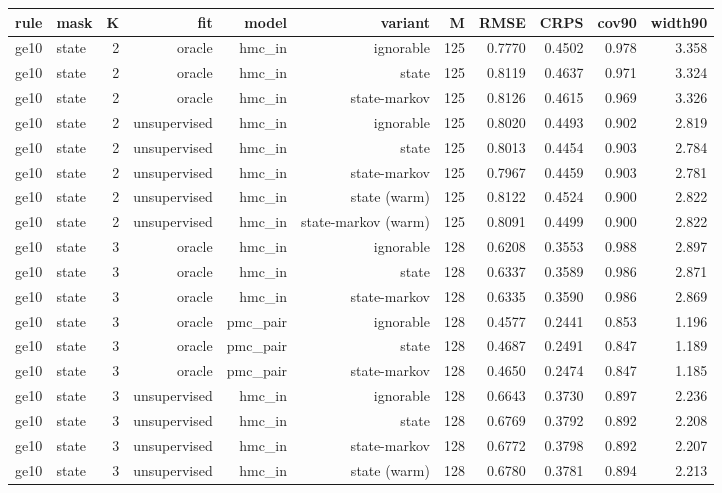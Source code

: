 \begin{table}[ht]
\centering
\small
\begin{tabular}{llrrrrrrrrr}
\toprule
rule & mask & K & fit & model & variant & M & RMSE & CRPS & cov90 & width90 \\
\midrule
ge10 & state & 2 & oracle & hmc\_in & ignorable & 125 & 0.7770 & 0.4502 & 0.978 & 3.358 \\
ge10 & state & 2 & oracle & hmc\_in & state & 125 & 0.8119 & 0.4637 & 0.971 & 3.324 \\
ge10 & state & 2 & oracle & hmc\_in & state-markov & 125 & 0.8126 & 0.4615 & 0.969 & 3.326 \\
ge10 & state & 2 & unsupervised & hmc\_in & ignorable & 125 & 0.8020 & 0.4493 & 0.902 & 2.819 \\
ge10 & state & 2 & unsupervised & hmc\_in & state & 125 & 0.8013 & 0.4454 & 0.903 & 2.784 \\
ge10 & state & 2 & unsupervised & hmc\_in & state-markov & 125 & 0.7967 & 0.4459 & 0.903 & 2.781 \\
ge10 & state & 2 & unsupervised & hmc\_in & state (warm) & 125 & 0.8122 & 0.4524 & 0.900 & 2.822 \\
ge10 & state & 2 & unsupervised & hmc\_in & state-markov (warm) & 125 & 0.8091 & 0.4499 & 0.900 & 2.822 \\
ge10 & state & 3 & oracle & hmc\_in & ignorable & 128 & 0.6208 & 0.3553 & 0.988 & 2.897 \\
ge10 & state & 3 & oracle & hmc\_in & state & 128 & 0.6337 & 0.3589 & 0.986 & 2.871 \\
ge10 & state & 3 & oracle & hmc\_in & state-markov & 128 & 0.6335 & 0.3590 & 0.986 & 2.869 \\
ge10 & state & 3 & oracle & pmc\_pair & ignorable & 128 & 0.4577 & 0.2441 & 0.853 & 1.196 \\
ge10 & state & 3 & oracle & pmc\_pair & state & 128 & 0.4687 & 0.2491 & 0.847 & 1.189 \\
ge10 & state & 3 & oracle & pmc\_pair & state-markov & 128 & 0.4650 & 0.2474 & 0.847 & 1.185 \\
ge10 & state & 3 & unsupervised & hmc\_in & ignorable & 128 & 0.6643 & 0.3730 & 0.897 & 2.236 \\
ge10 & state & 3 & unsupervised & hmc\_in & state & 128 & 0.6769 & 0.3792 & 0.892 & 2.208 \\
ge10 & state & 3 & unsupervised & hmc\_in & state-markov & 128 & 0.6772 & 0.3798 & 0.892 & 2.207 \\
ge10 & state & 3 & unsupervised & hmc\_in & state (warm) & 128 & 0.6780 & 0.3781 & 0.894 & 2.213 \\

\end{tabular}
\end{table}
